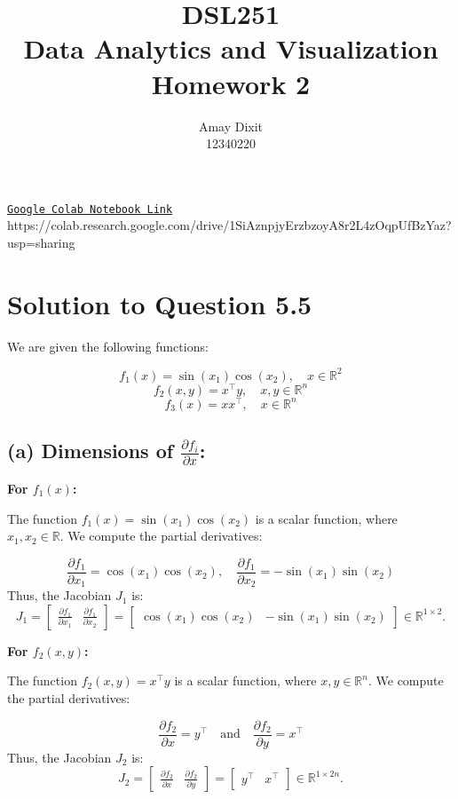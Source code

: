 \documentclass[12pt]{article}
\title{DSL251 \\ Data Analytics and Visualization \\ Homework 2}
\author{Amay Dixit \\ 12340220}
\date{}
\begin{document}
\maketitle

\begin{center}
\href{https://colab.research.google.com/drive/1SiAznpjyErzbzoyA8r2L4zOqpUfBzYaz?usp=sharing}{\texttt{Google Colab Notebook Link}}
https://colab.research.google.com/drive/1SiAznpjyErzbzoyA8r2L4zOqpUfBzYaz?usp=sharing
\end{center}

\section*{Solution to Question 5.5}

We are given the following functions:

\[
f_1(x) = \sin(x_1) \cos(x_2), \quad x \in \mathbb{R}^2
\]
\[
f_2(x, y) = x^\top y, \quad x, y \in \mathbb{R}^n
\]
\[
f_3(x) = xx^\top, \quad x \in \mathbb{R}^n
\]

\subsection*{(a) Dimensions of $\frac{\partial f_i}{\partial x}$:}

\textbf{For \( f_1(x) \):}

The function \( f_1(x) = \sin(x_1) \cos(x_2) \) is a scalar function, where \( x_1, x_2 \in \mathbb{R} \). We compute the partial derivatives:

\[
\frac{\partial f_1}{\partial x_1} = \cos(x_1) \cos(x_2), \quad \frac{\partial f_1}{\partial x_2} = -\sin(x_1) \sin(x_2)
\]
Thus, the Jacobian \( J_1 \) is:
\[
J_1 = \begin{bmatrix} \frac{\partial f_1}{\partial x_1} & \frac{\partial f_1}{\partial x_2} \end{bmatrix} = \begin{bmatrix} \cos(x_1) \cos(x_2) & -\sin(x_1) \sin(x_2) \end{bmatrix} \in \mathbb{R}^{1 \times 2}.
\]

\textbf{For \( f_2(x, y) \):}

The function \( f_2(x, y) = x^\top y \) is a scalar function, where \( x, y \in \mathbb{R}^n \). We compute the partial derivatives:

\[
\frac{\partial f_2}{\partial x} = y^\top \quad \text{and} \quad \frac{\partial f_2}{\partial y} = x^\top
\]
Thus, the Jacobian \( J_2 \) is:
\[
J_2 = \begin{bmatrix} \frac{\partial f_2}{\partial x} & \frac{\partial f_2}{\partial y} \end{bmatrix} = \begin{bmatrix} y^\top & x^\top \end{bmatrix} \in \mathbb{R}^{1 \times 2n}.
\]
\end{document}
